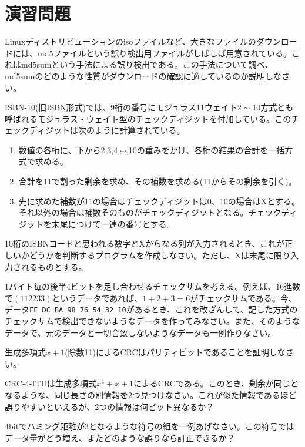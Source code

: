 \section*{演習問題}
\begin{problems}
\item Linuxディストリビューションのisoファイルなど、大きなファイルのダウンロードには、md5ファイルという誤り検出用ファイルがしばしば用意されている。これはmd5sumという手法による誤り検出である。この手法について調べ、md5sumのどのような性質がダウンロードの確認に適しているのか説明しなさい。

\item ISBN-10(旧ISBN形式)では、9桁の番号にモジュラス11ウェイト$2\sim 10$方式とも呼ばれるモジュラス・ウェイト型のチェックディジットを付加している。このチェックディジットは次のように計算されている。
\begin{enumerate}[1.]
\item 数値の各桁に、下から2,3,4,$\cdots$,10の重みをかけ、各桁の結果の合計を一括方式で求める。
\item 合計を11で割った剰余を求め、その補数を求める(11からその剰余を引く)。
\item 先に求めた補数が11の場合はチェックディジットは0、10の場合はXとする。それ以外の場合は補数そのものがチェックディジットとなる。チェックディジットを末尾につけて一連の番号とする。
\end{enumerate}
10桁のISBNコードと思われる数字とXからなる列が入力されるとき、これが正しいかどうかを判断するプログラムを作成しなさい。ただし、Xは末尾に限り入力されるものとする。

\item 1バイト毎の後半4ビットを足し合わせるチェックサムを考える。例えば、16進数で$(11 22 33)$というデータであれば、$1+2+3=6$がチェックサムである。今、データ\verb|FE DC BA 98 76 54 32 10|があるとき、これを改ざんして、記した方式のチェックサムで検出できないようなデータを作ってみなさい。また、そのようなデータで、元のデータと一切合致しないようなデータも一例作りなさい。

\item 生成多項式$x+1$(除数11)によるCRCはパリティビットであることを証明しなさい。

\item CRC-4-ITUは生成多項式$x^4+x+1$によるCRCである。このとき、剰余が同じとなるような、同じ長さの別情報を2つ見つけなさい。これが似た情報であるほど誤りやすいといえるが、2つの情報は何ビット異なるか？

\item 4bitでハミング距離が3となるような符号の組を一例あげなさい。この符号ではデータ量がどう増え、またどのような誤りなら訂正できるか？


\end{problems}
